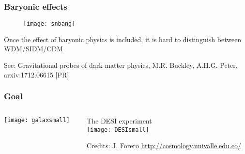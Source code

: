 \begin{frame}
  \frametitle{Baryonic effects}
  \begin{figure}
    \centering
    \texttt{[image: snbang]}
  \end{figure}
  Once the effect of baryonic physics is included, it is
  hard to distinguish between WDM/SIDM/CDM

  \begin{center}
    	
\footnotesize See: Gravitational probes of dark matter physics, M.R. Buckley, A.H.G. Peter, arxiv:1712.06615 [PR]
  \end{center}
\end{frame}

\begin{frame}
  \frametitle{Goal}
  \begin{columns}
  \begin{column}{0.65\textwidth}
  \texttt{[image: galaxsmall]}     
  \end{column}
  \begin{column}{0.35\textwidth}
    The DESI experiment\\
    \texttt{[image: DESIsmall]}
    
    {\tiny Credits: J. Forero \url{http://cosmology.univalle.edu.co/} }
  \end{column}
\end{columns}


\end{frame}


